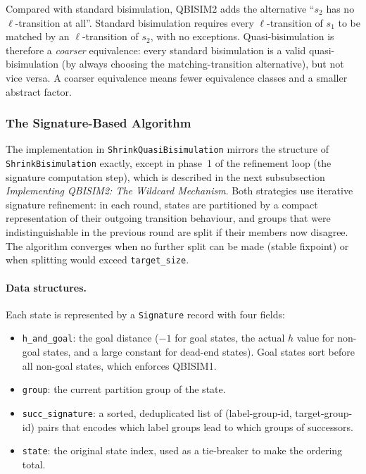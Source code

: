 \documentclass[11pt,a4paper]{article}
\begin{document}
Compared with standard bisimulation, QBISIM2 adds the alternative ``$s_2$ has
no $\ell$-transition at all''.  Standard bisimulation requires every
$\ell$-transition of $s_1$ to be matched by an $\ell$-transition of $s_2$,
with no exceptions.  Quasi-bisimulation is therefore a \emph{coarser}
equivalence: every standard bisimulation is a valid quasi-bisimulation (by
always choosing the matching-transition alternative), but not vice versa.  A
coarser equivalence means fewer equivalence classes and a smaller abstract
factor.

\subsubsection{The Signature-Based Algorithm}

The implementation in \texttt{ShrinkQuasiBisimulation} mirrors the structure
of \texttt{ShrinkBisimulation} exactly, except in phase~1 of the refinement
loop (the signature computation step), which is described in the next
subsubsection \emph{Implementing QBISIM2: The Wildcard Mechanism}.  Both strategies use iterative signature refinement: in each round,
states are partitioned by a compact representation of their outgoing transition
behaviour, and groups that were indistinguishable in the previous round are
split if their members now disagree.  The algorithm converges when no further
split can be made (stable fixpoint) or when splitting would exceed
\texttt{target\_size}.

\paragraph{Data structures.}
Each state is represented by a \texttt{Signature} record with four fields:
\begin{itemize}
  \item \texttt{h\_and\_goal}: the goal distance ($-1$ for goal states, the
    actual $h$ value for non-goal states, and a large constant for dead-end
    states).  Goal states sort before all non-goal states, which enforces
    QBISIM1.
  \item \texttt{group}: the current partition group of the state.
  \item \texttt{succ\_signature}: a sorted, deduplicated list of
    (label-group-id, target-group-id) pairs that encodes which label groups
    lead to which groups of successors.
  \item \texttt{state}: the original state index, used as a tie-breaker to
    make the ordering total.
\end{itemize}
\end{document}
